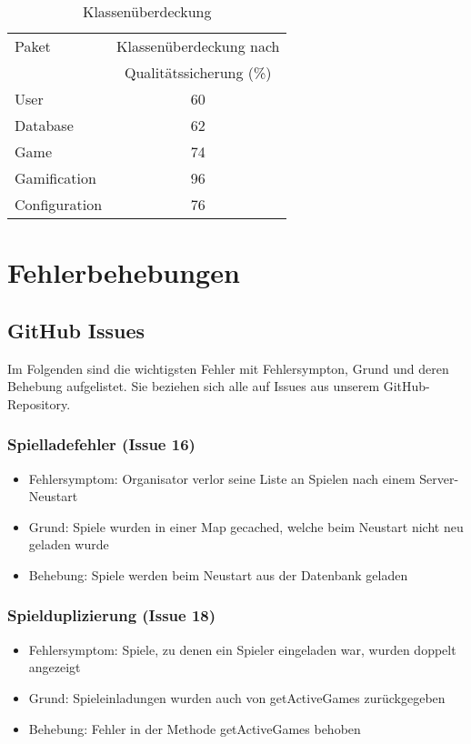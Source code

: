 \documentclass[a4paper]{scrreprt}
\begin{document}
    \vspace{20pt}
    \begin{table}[h]
        \begin{center}
        \begin{tabular}{ | l | c | }
            \hline
            Paket & Klassenüberdeckung nach \\
            & Qualitätssicherung (\%) \\ \hline
            User & 60 \\
            Database & 62 \\
            Game & 74 \\
            Gamification & 96 \\
            Configuration & 76  \\
            \hline
        \end{tabular}
        \end{center}
        \caption{Klassenüberdeckung}
    \end{table}%


    \chapter{Fehlerbehebungen}

    \section{GitHub Issues}
    Im Folgenden sind die wichtigsten Fehler mit Fehlersympton, Grund und deren Behebung aufgelistet. Sie beziehen sich alle auf Issues
    aus unserem GitHub-Repository.

    \subsection{Spielladefehler (Issue 16)}
    \begin{itemize}
        \item Fehlersymptom: Organisator verlor seine Liste an Spielen nach einem Server-Neustart
        \item Grund: Spiele wurden in einer Map gecached, welche beim Neustart nicht neu geladen wurde
        \item Behebung: Spiele werden beim Neustart aus der Datenbank geladen
    \end{itemize}

    \subsection{Spielduplizierung (Issue 18)}
    \begin{itemize}
        \item Fehlersymptom: Spiele, zu denen ein Spieler eingeladen war, wurden doppelt angezeigt
        \item Grund: Spieleinladungen wurden auch von getActiveGames zurückgegeben
        \item Behebung: Fehler in der Methode getActiveGames behoben
    \end{itemize}
\end{document}
